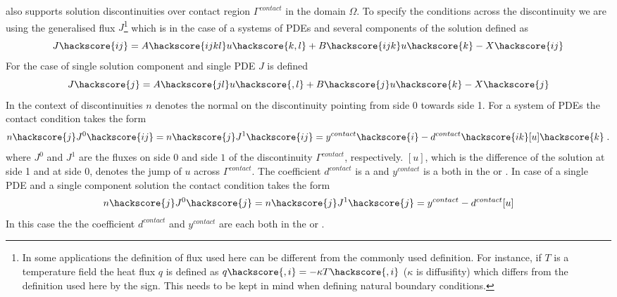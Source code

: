 \LinearPDE also supports solution discontinuities  over contact region $\Gamma^{contact}$
in the domain $\Omega$. To specify the conditions across the discontinuity we are using the
generalised flux $J$\footnote{In some applications the definition of flux used here can be different from the commonly used definition. For instance, if $T$ is a temperature field the heat flux $q$ is defined as $q\hackscore{,i}=-\kappa T\hackscore{,i}$ ($\kappa$ is diffusifity) which differs from the definition used here by the sign. This needs to be kept in mind when defining natural boundary conditions.} which is in the case of a systems of PDEs and several components of the solution
defined as
\begin{equation}\label{LINEARPDE.SYSTEM.5}
J\hackscore{ij}=A\hackscore{ijkl}u\hackscore{k,l}+B\hackscore{ijk}u\hackscore{k}-X\hackscore{ij}
\end{equation}
For the case of single solution component and single PDE $J$ is defined
\begin{equation}\label{LINEARPDE.SINGLE.5}
J\hackscore{j}=A\hackscore{jl}u\hackscore{,l}+B\hackscore{j}u\hackscore{k}-X\hackscore{j}
\end{equation}
In the context of discontinuities  $n$ denotes the normal on the
discontinuity pointing from side 0 towards side 1. For a system of PDEs
the contact condition takes the form
\begin{equation}\label{LINEARPDE.SYSTEM.6}
n\hackscore{j} J^{0}\hackscore{ij}=n\hackscore{j} J^{1}\hackscore{ij}=y^{contact}\hackscore{i} - d^{contact}\hackscore{ik} [u]\hackscore{k} \; .
\end{equation}
where $J^{0}$ and $J^{1}$ are the fluxes on side $0$ and side $1$ of the
discontinuity $\Gamma^{contact}$, respectively. $[u]$, which is the difference
of the solution at side 1 and at side 0, denotes the jump of $u$ across $\Gamma^{contact}$.
The coefficient $d^{contact}$ is a \RankTwo and $y^{contact}$ is a
\RankOne both in the \FunctionOnContactZero or \FunctionOnContactOne.
In case of a single PDE and a single component solution the contact condition takes the form
\begin{equation}\label{LINEARPDE.SINGLE.6}
n\hackscore{j} J^{0}\hackscore{j}=n\hackscore{j} J^{1}\hackscore{j}=y^{contact} - d^{contact}[u]
\end{equation}
In this case the the coefficient $d^{contact}$ and $y^{contact}$ are each \Scalar
both in the \FunctionOnContactZero or \FunctionOnContactOne.

